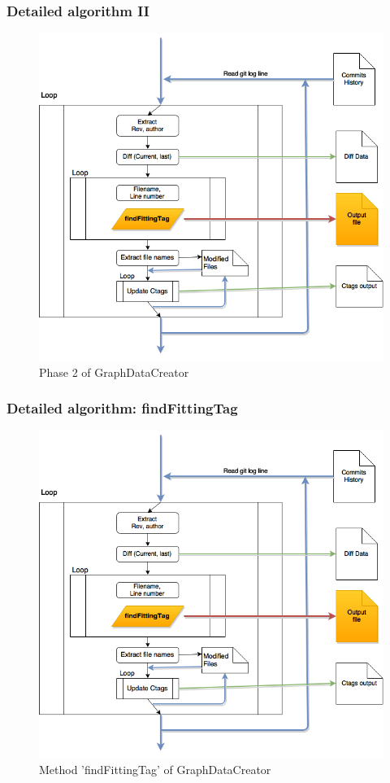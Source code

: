 \documentclass{beamer}
\begin{document}

\begin{frame}
\frametitle{Detailed algorithm II}
\begin{figure}
\includegraphics[scale=0.3]{GDCphase2.png} 
\caption{Phase 2 of GraphDataCreator}
\label{fig:phase2}
\end{figure}
\end{frame}


\begin{frame}
\frametitle{Detailed algorithm: findFittingTag}
\begin{figure}
\includegraphics[scale=0.3]{GDCphase2.png} 
\caption{Method 'findFittingTag' of GraphDataCreator}
\label{fig:phasefft}
\end{figure}
\end{frame}
\end{document}
